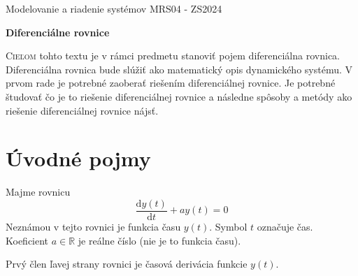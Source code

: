 \documentclass[a4paper, 10pt, ]{article}
\def\oznacenieCasti{MRS04 - ZS2024}
\begin{document}
\lstset{%
style=mystyle,
rangebeginprefix=\#\#\#\ cellB\ ,%
rangebeginsuffix=\ \#\#\#,%
rangeendprefix=\#\#\#\ cellE\ ,%
rangeendsuffix=\ \#\#\#,%
includerangemarker=false,
}





\fontsize{12pt}{22pt}\selectfont

\centerline{\textsf{Modelovanie a riadenie systémov} \hfill \textsf{\oznacenieCasti}}

\fontsize{18pt}{22pt}\selectfont





\begin{flushleft}
	\textbf{\textsf{Diferenciálne rovnice}}
\end{flushleft}





\normalsize

\bigskip

{\hypersetup{hidelinks}

\tableofcontents

}

\bigskip

\vspace{18pt}



\noindent
\lettrine[lines=3, nindent=0pt]{C}{ieľom} tohto textu je v rámci predmetu stanoviť pojem diferenciálna rovnica. Diferenciálna rovnica bude slúžiť ako matematický opis dynamického systému. V prvom rade je potrebné zaoberať riešením diferenciálnej rovnice. Je potrebné študovať čo je to riešenie diferenciálnej rovnice a následne spôsoby a metódy ako riešenie diferenciálnej rovnice nájsť.





\section{Úvodné pojmy}

Majme rovnicu
\begin{equation} \label{eq:1}
    \frac{\text{d}y(t)}{\text{d}t} + a y(t) = 0
\end{equation}
Neznámou v tejto rovnici je funkcia času $y(t)$. Symbol $t$ označuje čas. Koeficient $a \in \mathbb R$ je reálne číslo (nie je to funkcia času). 

Prvý člen ľavej strany rovnici je časová derivácia funkcie $y(t)$. 
\end{document}
